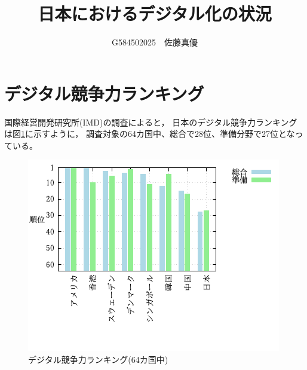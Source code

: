 \documentclass[a4paper,11pt,dvipdfmx]{ujarticle}
\title{日本におけるデジタル化の状況}
\author{G584502025　佐藤真優}
\begin{document}
\maketitle %

\section{デジタル競争力ランキング}
国際経営開発研究所(IMD)の調査\cite{IMD}によると，
日本のデジタル競争力ランキングは図\ref{fig:競争力}に示すように，
調査対象の64カ国中、総合で28位、準備分野で27位となっている。
\begin{figure}[htbp]
    \centering
    \includegraphics{fig51.png}
    \caption{デジタル競争力ランキング(64カ国中)}\label{fig:競争力}
\end{figure}
\end{document}
